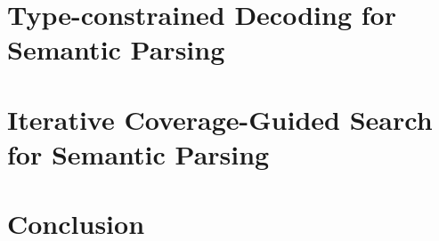 \documentclass[hidelinks,12pt]{cmuthesis}
\begin{document}
\chapter{Type-constrained Decoding for Semantic Parsing}
\label{chapter:wikitables}

\chapter{Iterative Coverage-Guided Search for Semantic Parsing}
\label{chapter:nlvr}

\chapter{Conclusion}
\label{chapter:conclusion}


%

\backmatter


\renewcommand{\bibsection}{\chapter{\bibname}}

\end{document}
